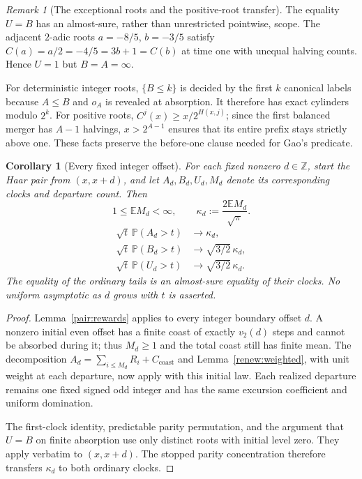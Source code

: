 \documentclass[11pt]{amsart}
\newtheorem{corollary}[theorem]{Corollary}
\theoremstyle{definition}
\theoremstyle{remark}
\newtheorem{remark}[theorem]{Remark}
\newcommand{\Z}{\mathbb Z}
\newcommand{\E}{\mathbb E}
\newcommand{\PP}{\mathbb P}
\begin{document}
\begin{remark}[The exceptional roots and the positive-root transfer]
The equality $U=B$ has an almost-sure, rather than unrestricted pointwise,
scope. The adjacent $2$-adic roots $a=-8/5$, $b=-3/5$ satisfy
$C(a)=a/2=-4/5=3b+1=C(b)$ at time one with unequal halving counts.
Hence $U=1$ but $B=A=\infty$.

For deterministic integer roots, $\{B\le k\}$ is decided by the first
$k$ canonical labels because $A\le B$ and $o_A$ is revealed at absorption.
It therefore has exact cylinders modulo $2^k$. For positive roots,
$C^j(x)\ge x/2^{H(x,j)}$; since the first balanced merger has $A-1$
halvings, $x>2^{A-1}$ ensures that its entire prefix stays strictly above
one. These facts preserve the before-one clause needed for Gao's predicate.
\end{remark}
\begin{corollary}[Every fixed integer offset]\label{ordinary:fixedoffset}
For each fixed nonzero $d\in\Z$, start the Haar pair from $(x,x+d)$,
and let $A_d,B_d,U_d,M_d$ denote its corresponding clocks and departure
count. Then
\[
 1\le\E M_d<\infty,\qquad
 \kappa_d:=\frac{2\E M_d}{\sqrt\pi}.
\]
\begin{align*}
 \sqrt t\,\PP(A_d>t)&\longrightarrow\kappa_d,\\
 \sqrt t\,\PP(B_d>t)&\longrightarrow\sqrt{3/2}\,\kappa_d,\\
 \sqrt t\,\PP(U_d>t)&\longrightarrow\sqrt{3/2}\,\kappa_d.
\end{align*}
The equality of the ordinary tails is an almost-sure equality of their
clocks. No uniform asymptotic as $d$ grows with $t$ is asserted.
\end{corollary}
\begin{proof}
Lemma~\ref{pair:rewards} applies to every integer boundary offset $d$.
A nonzero initial even offset has a finite
coast of exactly $v_2(d)$ steps and cannot be absorbed during it; thus
$M_d\ge1$ and the total coast still has finite mean. The decomposition
$A_d=\sum_{i\le M_d}R_i+C_{\mathrm{coast}}$ and
Lemma~\ref{renew:weighted}, with unit weight at each departure,
now apply with this initial law. Each
realized departure remains one fixed signed odd integer and has the same
excursion coefficient and uniform domination.

The first-clock identity, predictable parity permutation, and the argument
that $U=B$ on finite absorption use only distinct roots with initial level
zero. They apply verbatim to $(x,x+d)$. The stopped parity concentration
therefore transfers $\kappa_d$ to both ordinary clocks.
\end{proof}
\end{document}
